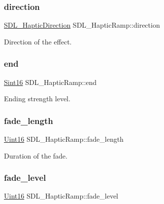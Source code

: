 \subsubsection{\texorpdfstring{direction}{direction}}
{\footnotesize\ttfamily \hyperlink{struct_s_d_l___haptic_direction}{S\+D\+L\+\_\+\+Haptic\+Direction} S\+D\+L\+\_\+\+Haptic\+Ramp\+::direction}

Direction of the effect. \mbox{\label{struct_s_d_l___haptic_ramp_a16dd3ee307795248e21ee45ba8fb4c6c}} 
\subsubsection{\texorpdfstring{end}{end}}
{\footnotesize\ttfamily \hyperlink{_s_d_l__stdinc_8h_a9d0257032c0e146ab6121bf0122712f5}{Sint16} S\+D\+L\+\_\+\+Haptic\+Ramp\+::end}

Ending strength level. \mbox{\label{struct_s_d_l___haptic_ramp_ad58a8f7cfdf659b45f0503fc56db7436}} 
\subsubsection{\texorpdfstring{fade\+\_\+length}{fade\_length}}
{\footnotesize\ttfamily \hyperlink{_s_d_l__stdinc_8h_a31fcc0a076c9068668173ee26d33e42b}{Uint16} S\+D\+L\+\_\+\+Haptic\+Ramp\+::fade\+\_\+length}

Duration of the fade. \mbox{\label{struct_s_d_l___haptic_ramp_a66b586f2e6a23a085a7b2854f61752c5}} 
\subsubsection{\texorpdfstring{fade\+\_\+level}{fade\_level}}
{\footnotesize\ttfamily \hyperlink{_s_d_l__stdinc_8h_a31fcc0a076c9068668173ee26d33e42b}{Uint16} S\+D\+L\+\_\+\+Haptic\+Ramp\+::fade\+\_\+level}

